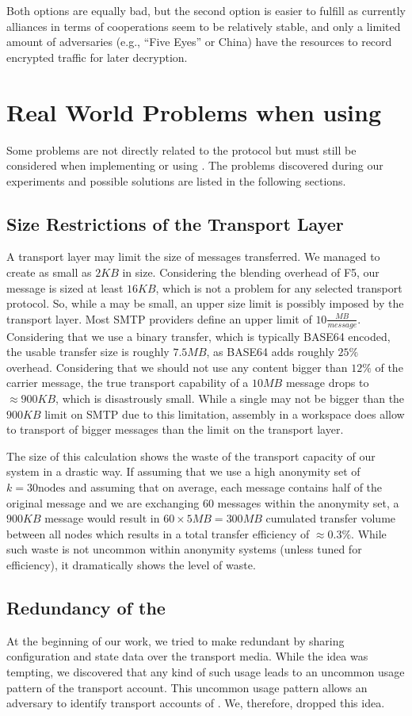 Both options are equally bad, but the second option is easier to fulfill as currently alliances in terms of cooperations seem to be relatively stable, and only a limited amount of adversaries (e.g., ``Five Eyes'' or China) have the resources to record encrypted traffic for later decryption.

\chapter{Real World Problems when using \MessageVortex}
Some problems are not directly related to the \MessageVortex{} protocol but must still be considered when implementing or using \MessageVortex. The problems discovered during our experiments and possible solutions are listed in the following sections.

\section{Size Restrictions of the Transport Layer}
A transport layer may limit the size of messages transferred. We managed to create \VortexMessages{} as small as $2KB$ in size. Considering the blending overhead of F5, our message is sized at least $16KB$, which is not a problem for any selected transport protocol. So, while a \VortexMessage{} may be small, an upper size limit is possibly imposed by the transport layer. Most SMTP providers define an upper limit of $10\frac{MB}{message}$. Considering that we use a binary transfer, which is typically BASE64 encoded, the usable transfer size is roughly $7.5MB$, as BASE64 adds roughly $25\%$ overhead. Considering that we should not use any content bigger than $12\%$ of the carrier message, the true transport capability of a $10MB$ message drops to $\approx 900KB$, which is disastrously small. While a single \VortexMessage{} may not be bigger than the $900KB$ limit on SMTP due to this limitation, assembly in a workspace does allow to transport of bigger messages than the limit on the transport layer.

The size of this calculation shows the waste of the transport capacity of our system in a drastic way. If assuming that we use a high anonymity set of $k=30 \text{nodes}$ and assuming that on average, each message contains half of the original message and we are exchanging 60 messages within the anonymity set, a $900KB$ message would result in $60\times 5MB=300MB$ cumulated transfer volume between all nodes which results in a total transfer efficiency of $\approx 0.3\%$. While such waste is not uncommon within anonymity systems (unless tuned for efficiency), it dramatically shows the level of waste.

\section{Redundancy of the \VortexNode}
At the beginning of our work, we tried to make \VortexNodes{} redundant by sharing configuration and state data over the transport media. While the idea was tempting, we discovered that any kind of such usage leads to an uncommon usage pattern of the transport account. This uncommon usage pattern allows an adversary to identify transport accounts of \VortexNodes. We, therefore, dropped this idea. 